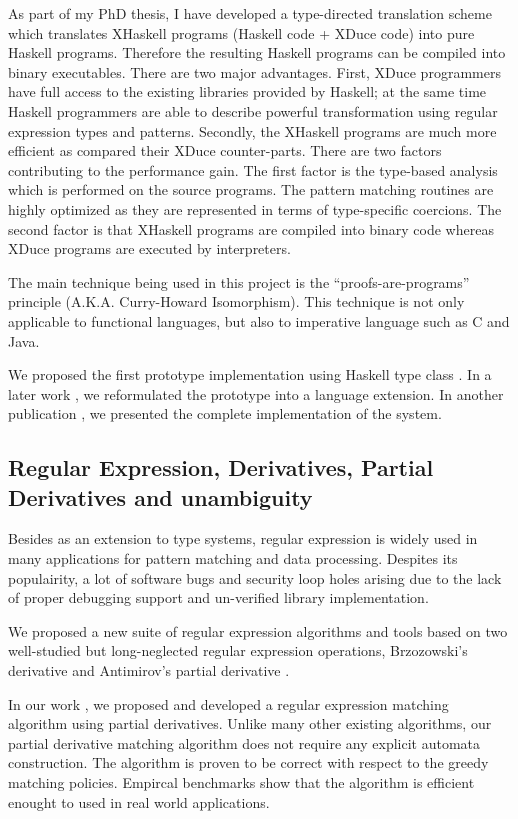 \documentclass[12pt]{article}
\theoremstyle{plain} \numberwithin{equation}{section}
\theoremstyle{definition}
\begin{document}
As part of my PhD thesis, I have developed a
type-directed translation scheme which translates XHaskell programs
(Haskell code + XDuce code) into pure Haskell programs. Therefore
the resulting Haskell programs can be compiled into binary executables.
There are two major advantages. First, XDuce programmers have full
access to the existing libraries provided by Haskell; at the same
time Haskell programmers are able to describe powerful transformation
using regular expression types and patterns. Secondly, the XHaskell
programs are much more efficient as compared their XDuce counter-parts.
There are two factors contributing to the performance gain. 
The first factor is the type-based analysis which is performed on the 
source programs. The pattern matching routines are highly optimized
as they are represented in terms of type-specific coercions. The second 
factor is that XHaskell programs are compiled into binary code whereas
XDuce programs are executed by interpreters.

The main technique being used in this project is the
``proofs-are-programs'' principle (A.K.A. Curry-Howard Isomorphism). 
This technique is not only applicable to functional
languages, but also to imperative language such as C and Java.

We proposed the first prototype implementation using Haskell type class
 \cite{semantic-subtyping}. In a later work \cite{ml-workshop05}, 
we reformulated the prototype into a language extension. 
In another publication \cite{ifl2007}, we presented the complete implementation of the system.


\subsection{Regular Expression, Derivatives, Partial Derivatives and unambiguity}

Besides as an extension to type systems, regular expression is widely used in many
applications for pattern matching and data processing.
Despites its populairity, a lot of software bugs and security loop holes arising due to the
lack of proper debugging support and un-verified library implementation. 

We proposed a new suite of regular expression algorithms and tools based on two well-studied
but long-neglected regular expression operations,
Brzozowski's derivative \cite{321249} and Antimirov's partial derivative \cite{Antimirov96Partial}.

In our work \cite{DBLP:conf/ppdp/SulzmannL12}, we proposed and developed a regular expression
matching algorithm using partial derivatives. Unlike many other existing algorithms, our
partial derivative matching algorithm does not require any explicit automata construction.
The algorithm is proven to be correct with respect to the greedy matching policies. Empircal
benchmarks show that the algorithm is efficient enought to used in real world applications.
\end{document}
